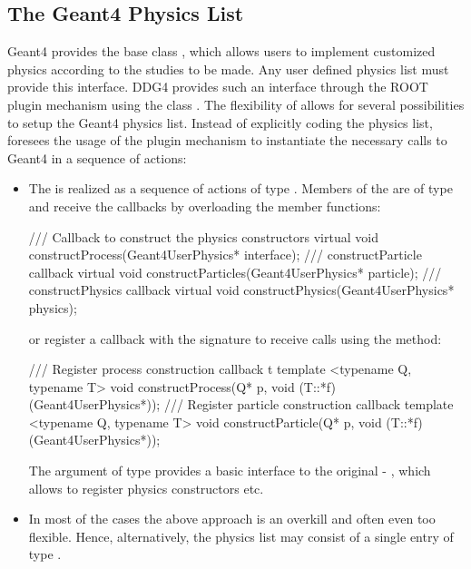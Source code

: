 \subsection{The Geant4 Physics List}
\label{sec:ddg4-implementation-physics-list}
\noindent 
Geant4 provides the base class , which allows users
to implement customized physics according to the studies to be made.
Any user defined physics list must provide this interface. DDG4 provides such an interface
through the ROOT plugin mechanism using the class .
The flexibility of \DDG allows for several possibilities to setup the Geant4
physics list. Instead of explicitly coding the physics list, \DDG foresees the
usage of the plugin mechanism to instantiate the necessary calls to Geant4 in a
sequence of actions:
\begin{itemize}
\item The  is realized as a sequence of actions of type 
    {}.
    Members of the 
    {} are of type
    {} and receive the callbacks by overloading 
    the member functions:
\begin{unnumberedcode}
  /// Callback to construct the physics constructors
  virtual void constructProcess(Geant4UserPhysics* interface);
  /// constructParticle callback
  virtual void constructParticles(Geant4UserPhysics* particle);
  /// constructPhysics callback
  virtual void constructPhysics(Geant4UserPhysics* physics);
\end{unnumberedcode}
    or register a callback with the signature {}
    to receive calls using the method:
\begin{unnumberedcode}
  /// Register process construction callback t
  template <typename Q, typename T> void constructProcess(Q* p, void (T::*f)(Geant4UserPhysics*));
  /// Register particle construction callback
  template <typename Q, typename T> void constructParticle(Q* p, void (T::*f)(Geant4UserPhysics*));
\end{unnumberedcode}
    The argument of type 
    {} provides a basic interface to the original
    - , which allows to register physics constructors etc.

\item In most of the cases the above approach is an overkill and often even too flexible.
    Hence, alternatively, the physics list may consist of a single entry of type 
    {}.
\end{itemize}

